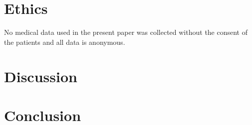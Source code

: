 \documentclass{article}
\begin{document}
\newpage
\section{Ethics}

No medical data used in the present paper was collected without the consent of the patients and all data is anonymous.

\section{Discussion}
\section{Conclusion}
\newpage

\nocite{*}
\medskip
\begin{multicols}{2}
\printbibliography[heading=bibintoc]
\end{multicols}
\end{document}
